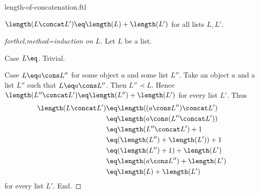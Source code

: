 \documentclass{naproche-library}
\begin{document}
\begin{smodule}[title=Length of Concatenation]{length-of-concatenation.ftl}

\begin{proposition}[forthel,id=LISTS_LENGTHCONCAT_4512036658964875]
  $\length(L \concat L') \eq \length(L) + \length(L')$ for all lists $L, L'$.
\end{proposition}
\begin{proof}[forthel,method=induction on $L$]
  Let $L$ be a list.

  Case $L \eq \list{}$. Trivial.

  Case $L \eq a \cons L''$ for some object $a$ and some list $L''$.
    Take an object $a$ and a list $L''$ such that $L \eq a \cons L''$.
    Then $L'' \prec L$.
    Hence $\length(L'' \concat L') \eq \length(L'') + \length(L')$ for every list $L'$.
    Thus
    \begin{align*}
      \length(L \concat L')
        &\eq \length((a \cons L'') \concat L')\\
        &\eq \length(a \cons (L'' \concat L'))\\
        &\eq \length(L'' \concat L') + 1\\
        &\eq (\length(L'') + \length(L')) + 1\\
        &\eq (\length(L'') + 1) + \length(L')\\
        &\eq \length(a \cons L'') + \length(L')\\
        &\eq \length(L) + \length(L')
    \end{align*}
    for every list $L'$.
  End.
\end{proof}
\end{smodule}
\end{document}
